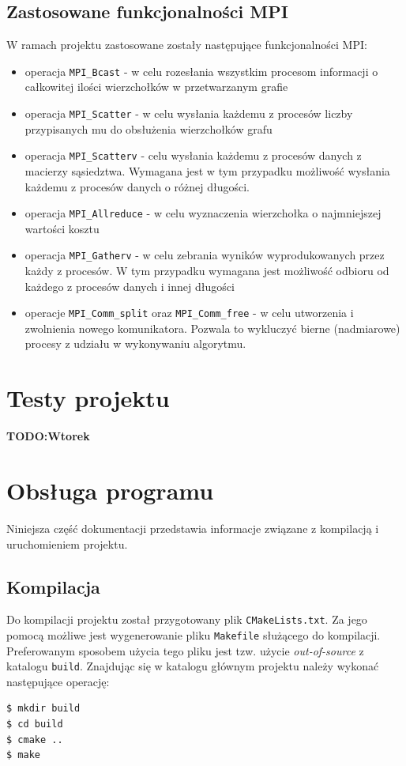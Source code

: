 \documentclass[12pt]{article}
\begin{document}
\subsection{Zastosowane funkcjonalności MPI}
W ramach projektu zastosowane zostały następujące funkcjonalności MPI:
\begin{itemize}
\item operacja \lstinline{MPI_Bcast} - w celu rozesłania wszystkim procesom informacji o całkowitej ilości wierzchołków w przetwarzanym grafie
\item operacja \lstinline{MPI_Scatter} - w celu wysłania każdemu z procesów liczby przypisanych mu do obsłużenia wierzchołków grafu
\item operacja \lstinline{MPI_Scatterv} - celu wysłania każdemu z procesów danych z macierzy sąsiedztwa. Wymagana jest w tym przypadku możliwość wysłania każdemu z procesów danych o różnej długości.
\item operacja \lstinline{MPI_Allreduce} - w celu wyznaczenia wierzchołka o najmniejszej wartości kosztu
\item operacja \lstinline{MPI_Gatherv} - w celu zebrania wyników wyprodukowanych przez każdy z procesów. W tym przypadku wymagana jest możliwość odbioru od każdego z procesów danych i innej długości
\item operacje \lstinline{MPI_Comm_split} oraz \lstinline{MPI_Comm_free} - w celu utworzenia i zwolnienia nowego komunikatora. Pozwala to wykluczyć bierne (nadmiarowe) procesy z udziału w wykonywaniu algorytmu.
\end{itemize}

\section{Testy projektu}
\textbf{TODO:Wtorek}

\newpage
\section{Obsługa programu}
Niniejsza część dokumentacji przedstawia informacje związane z kompilacją i uruchomieniem projektu.

\subsection{Kompilacja}
Do kompilacji projektu został przygotowany plik \lstinline|CMakeLists.txt|. Za jego pomocą możliwe jest wygenerowanie pliku \lstinline{Makefile} służącego do kompilacji. Preferowanym sposobem użycia tego pliku jest tzw. użycie \textit{out-of-source} z katalogu \lstinline{build}. Znajdując się w katalogu głównym projektu należy wykonać następujące operację:
\begin{lstlisting}
$ mkdir build
$ cd build
$ cmake ..
$ make
\end{lstlisting}
\end{document}
